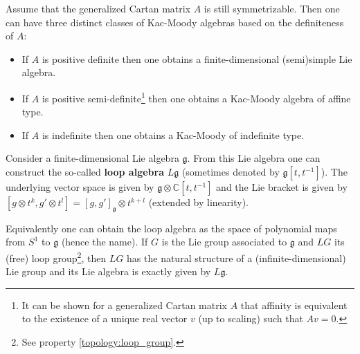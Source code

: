    \begin{remark}
        Assume that the generalized Cartan matrix $A$ is still symmetrizable. Then one can have three distinct classes of Kac-Moody algebras based on the definiteness of $A$:
        \begin{itemize}
            \item If $A$ is positive definite then one obtains a finite-dimensional (semi)simple Lie algebra.
            \item If $A$ is positive semi-definite\footnote{It can be shown for a generalized Cartan matrix $A$ that affinity is equivalent to the existence of a unique real vector $v$ (up to scaling) such that $Av=0$.} then one obtains a Kac-Moody algebra of affine type.
            \item If $A$ is indefinite then one obtains a Kac-Moody of indefinite type.
        \end{itemize}
    \end{remark}

    \begin{construct}
    Consider a finite-dimensional Lie algebra $\mathfrak{g}$. From this Lie algebra one can construct the so-called \textbf{loop algebra} $L\mathfrak{g}$ (sometimes denoted by $\mathfrak{g}[t, t^{-1}]$). The underlying vector space is given by $\mathfrak{g}\otimes\mathbb{C}[t, t^{-1}]$ and the Lie bracket is given by $[g\otimes t^k, g'\otimes t^l] = [g, g']_{\mathfrak{g}}\otimes t^{k+l}$ (extended by linearity).

    Equivalently one can obtain the loop algebra as the space of polynomial maps from $S^1$ to $\mathfrak{g}$ (hence the name). If $G$ is the Lie group associated to $\mathfrak{g}$ and $LG$ its (free) loop group\footnote{See property \ref{topology:loop_group}.}, then $LG$ has the natural structure of a (infinite-dimensional) Lie group and its Lie algebra is exactly given by $L\mathfrak{g}$.
    \end{construct}

